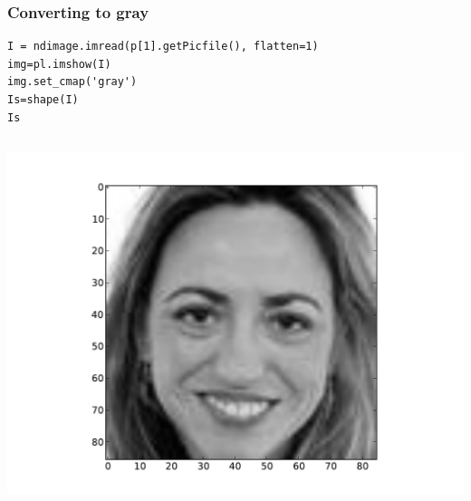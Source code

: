 \documentclass[10pt, colorlinks]{beamer}
\begin{document}
\begin{frame}[fragile]\frametitle{Converting to gray}
\begin{verbatim}
I = ndimage.imread(p[1].getPicfile(), flatten=1)
img=pl.imshow(I)
img.set_cmap('gray')
Is=shape(I)
Is
\end{verbatim}

\begin{columns}
\includegraphics[width=\textwidth]{plwfigis/CursP_4_figure22}

\end{columns}
\end{frame}
\end{document}
